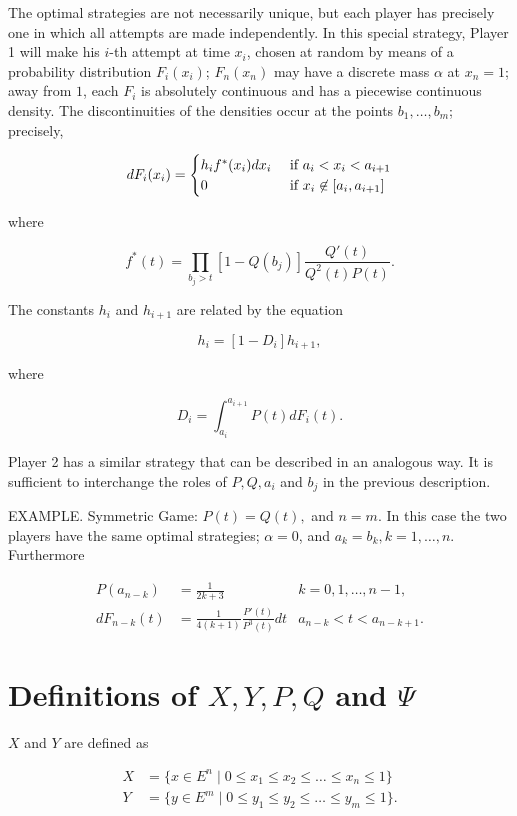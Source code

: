 \documentclass{article}
\begin{document}
The optimal strategies are not necessarily unique, but each player has
precisely one in which all attempts are made independently. In this special
strategy, Player 1 will make his $i$-th attempt at time $x_i$, chosen at random
by means of a probability distribution $F_i(x_i)$; $F_n(x_n)$ may have a
discrete mass $\alpha$ at $x_n = 1$; away from $1$, each $F_i$ is absolutely
continuous and has a piecewise continuous density. The discontinuities of the
densities occur at the points $b_1, \dots, b_m$; precisely,

\[
dF_i(x_i) = \begin{cases}
h_i f^*(x_i) dx_i & \textup{ if } a_i < x_i < a_{i+1} \\
0                 & \textup{ if } x_i \not \in [a_i, a_{i+1}] \\
\end{cases}
\]

where

\[
f^*(t) = \prod_{b_j > t} \left [ 1 - Q(b_j) \right ] \frac{Q'(t)}{Q^2(t) P(t)}.
\]

The constants $h_i$ and $h_{i+1}$ are related by the equation

\[
h_i = [1 - D_i] h_{i+1},
\]

where

\[
D_i = \int_{a_i}^{a_{i+1}} P(t) dF_i(t).
\]

Player 2 has a similar strategy that can be described in an analogous way. It
is sufficient to interchange the roles of $P, Q, a_i$ and $b_j$ in the previous
description.

EXAMPLE. Symmetric Game: $P(t) = Q(t),$ and $n = m$. In this case the two
players have the same optimal strategies; $\alpha = 0$, and $a_k = b_k, k=1,
\dots, n$. Furthermore

\[
\begin{aligned}
P(a_{n-k}) &= \frac{1}{2k+3} & k = 0, 1, \dots, n-1, \\
dF_{n-k}(t) &= \frac{1}{4(k+1)} \frac{P'(t)}{P^3(t)} dt & a_{n-k} < t <
a_{n-k+1}.
\end{aligned}
\]

\section{Definitions of $X, Y, P, Q$ and $\Psi$}

$X$ and $Y$ are defined as

\[
\begin{aligned}
   X &= \{ x \in E^n \mid 0 \leq x_1 \leq x_2 \leq \dots \leq x_n \leq 1 \} \\
   Y &= \{ y \in E^m \mid 0 \leq y_1 \leq y_2 \leq \dots \leq y_m \leq 1 \}.
\end{aligned}
\]
\end{document}
